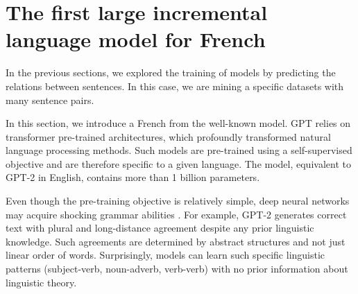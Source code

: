 \setchapterpreamble[u]{\margintoc}
\chapter{The first large incremental language model for French}




In the previous sections, we explored the training of models by predicting the relations between sentences. In this case, we are mining a specific datasets with many sentence pairs. 

In this section, we introduce a French  from the well-known  model. GPT relies on transformer pre-trained architectures, which profoundly transformed natural language processing methods. Such models are pre-trained using a self-supervised objective and are therefore specific to a given language. The model, equivalent to GPT-2 in English, contains more than 1 billion parameters. 

Even though the pre-training objective is relatively simple, deep neural networks may acquire shocking grammar abilities \parencite{linzen_2020}. For example, GPT-2 generates correct text with plural and long-distance agreement despite any prior linguistic knowledge. Such agreements are determined by abstract structures and not just linear order of words. Surprisingly, models can learn such specific linguistic patterns (subject-verb, noun-adverb, verb-verb) with no prior information about linguistic theory. 

